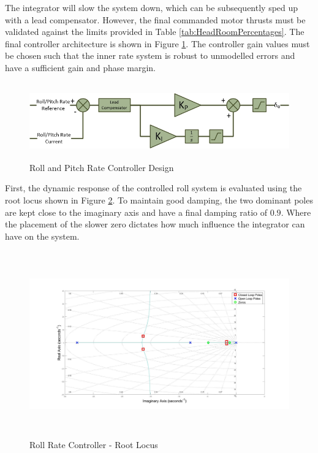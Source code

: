 	The integrator will slow the system down, which can be subsequently sped up with a lead compensator. However, the final commanded motor thrusts must be validated against the limits provided in Table \ref{tab:HeadRoomPercentages}. The final controller architecture is shown in Figure \ref{IM_RollPitchRateController}. The controller gain values must be chosen such that the inner rate system is robust to unmodelled errors and have a sufficient gain and phase margin.
	
	\begin{figure}[H]
		\centering
		\includegraphics[height = 3.3cm]{../References/Diagrams/RollRateController.jpg}
		\caption{Roll and Pitch Rate Controller Design}
		\label{IM_RollPitchRateController}
	\end{figure}	
		
	First, the dynamic response of the controlled roll system is evaluated using the root locus shown in Figure \ref{IM_RollRateControlRoot}. To maintain good damping, the two dominant poles are kept close to the imaginary axis and have a final damping ratio of $0.9$. Where the placement of the slower zero dictates how much influence the integrator can have on the system.
	
	\begin{figure}[H]
		\centering
		\includegraphics[height = 8cm]{../Design/Matlab/Controllers/roll_rate_root.jpg}
		\caption{Roll Rate Controller -  Root Locus}
		\label{IM_RollRateControlRoot}
	\end{figure}
	
